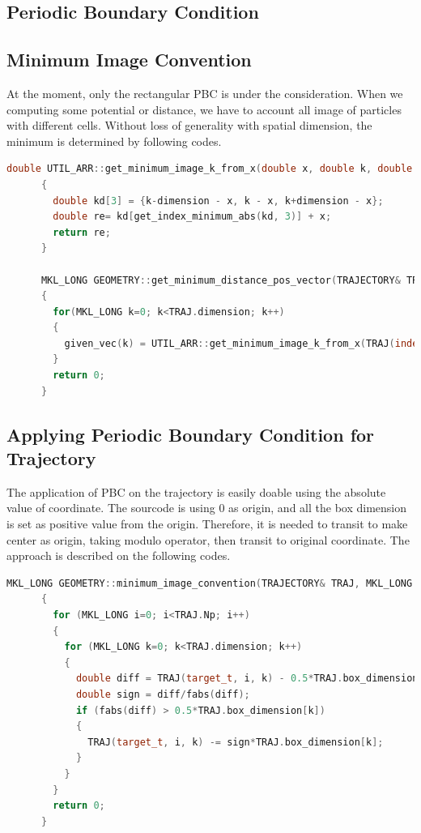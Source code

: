 \message{ !name(brief_Brownian_dynamics.tex)}\documentclass[10pt, a4paper]{report}
\begin{document}
\begin{appendices}
  \section{Periodic Boundary Condition}
  \subsection{Minimum Image Convention}
    At the moment, only the rectangular PBC is under the consideration. When we computing some potential or distance, we have to account all image of particles with different cells. Without loss of generality with spatial dimension, the minimum is determined by following codes.
    \begin{lstlisting}[language=C++, frame=single]
      double UTIL_ARR::get_minimum_image_k_from_x(double x, double k, double dimension)
      {
        double kd[3] = {k-dimension - x, k - x, k+dimension - x};
        double re= kd[get_index_minimum_abs(kd, 3)] + x;
        return re;
      }

      MKL_LONG GEOMETRY::get_minimum_distance_pos_vector(TRAJECTORY& TRAJ, MKL_LONG index_t, MKL_LONG given_index, MKL_LONG target_index, MATRIX& given_vec)
      {
        for(MKL_LONG k=0; k<TRAJ.dimension; k++)
        {
          given_vec(k) = UTIL_ARR::get_minimum_image_k_from_x(TRAJ(index_t, given_index, k), TRAJ(index_t, target_index, k), TRAJ.box_dimension[k]);
        }
        return 0;
      }
    \end{lstlisting}
  \subsection{Applying Periodic Boundary Condition for Trajectory}
    The application of PBC on the trajectory is easily doable using the absolute value of coordinate. The sourcode is using 0 as origin, and all the box dimension is set as positive value from the origin. Therefore, it is needed to transit to make center as origin, taking modulo operator, then transit to original coordinate. The approach is described on the following codes.
    \begin{lstlisting}[language=C++, frame=single]
      MKL_LONG GEOMETRY::minimum_image_convention(TRAJECTORY& TRAJ, MKL_LONG target_t)
      {
        for (MKL_LONG i=0; i<TRAJ.Np; i++)
        {
          for (MKL_LONG k=0; k<TRAJ.dimension; k++)
          {
            double diff = TRAJ(target_t, i, k) - 0.5*TRAJ.box_dimension[k];
            double sign = diff/fabs(diff);
            if (fabs(diff) > 0.5*TRAJ.box_dimension[k])
            {
              TRAJ(target_t, i, k) -= sign*TRAJ.box_dimension[k];
            }
          }
        }
        return 0;
      }
    \end{lstlisting}
  

\end{appendices}
\end{document}
